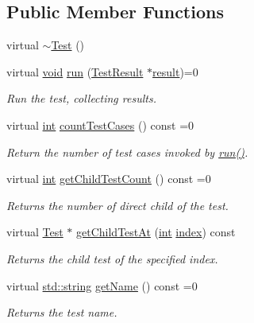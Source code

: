 \subsection*{Public Member Functions}
\begin{DoxyCompactItemize}
\item 
virtual \hyperlink{class_test_ac9dcc51f46141d9ed1e8206ca0011b8c}{$\sim$\-Test} ()
\item 
virtual \hyperlink{wglew_8h_aeea6e3dfae3acf232096f57d2d57f084}{void} \hyperlink{class_test_a7beeb95dc0d058bd3bfea1a75463cb03}{run} (\hyperlink{class_test_result}{Test\-Result} $\ast$\hyperlink{glew_8h_a5fb5836a37f7607602a16ad733ed6357}{result})=0
\begin{DoxyCompactList}\small\item\em Run the test, collecting results. \end{DoxyCompactList}\item 
virtual \hyperlink{wglew_8h_a500a82aecba06f4550f6849b8099ca21}{int} \hyperlink{class_test_aad2b7244c7cec3f3aa9f81d12b15c8cf}{count\-Test\-Cases} () const =0
\begin{DoxyCompactList}\small\item\em Return the number of test cases invoked by \hyperlink{class_test_a7beeb95dc0d058bd3bfea1a75463cb03}{run()}. \end{DoxyCompactList}\item 
virtual \hyperlink{wglew_8h_a500a82aecba06f4550f6849b8099ca21}{int} \hyperlink{class_test_a7aaab95037b7222573471074c56df85b}{get\-Child\-Test\-Count} () const =0
\begin{DoxyCompactList}\small\item\em Returns the number of direct child of the test. \end{DoxyCompactList}\item 
virtual \hyperlink{class_test}{Test} $\ast$ \hyperlink{class_test_aad295af3b440fdec4bd95ddd422466b8}{get\-Child\-Test\-At} (\hyperlink{wglew_8h_a500a82aecba06f4550f6849b8099ca21}{int} \hyperlink{fmod__codec_8h_a57f14e05b1900f16a2da82ade47d0c6d}{index}) const 
\begin{DoxyCompactList}\small\item\em Returns the child test of the specified index. \end{DoxyCompactList}\item 
virtual \hyperlink{glew_8h_ae84541b4f3d8e1ea24ec0f466a8c568b}{std\-::string} \hyperlink{class_test_a5e024da199f811a33264e432c21dcc94}{get\-Name} () const =0
\begin{DoxyCompactList}\small\item\em Returns the test name. \end{DoxyCompactList}\item 

\end{DoxyCompactItemize}

